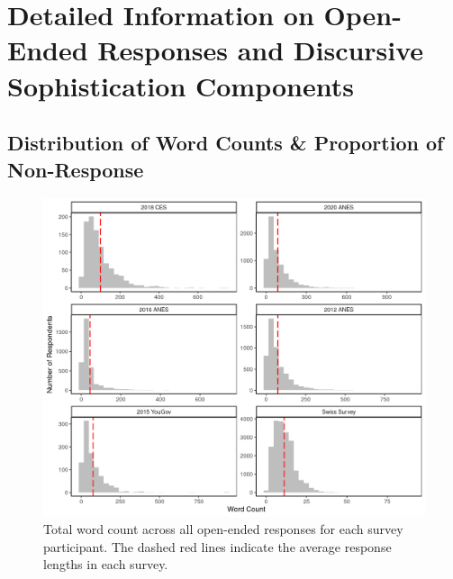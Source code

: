 


\clearpage
\section[Information on Discursive Sophistication Components]{Detailed Information on Open-Ended Responses and Discursive Sophistication Components}\label{app:oeinfo}

\subsection{Distribution of Word Counts \& Proportion of Non-Response}
\begin{figure}[ht]\centering
	\includegraphics{../fig/wc.png}
	\caption[Total word count across all open-ended responses]{Total word count across all open-ended responses for each survey participant. The dashed red lines indicate the average response lengths in each survey.}\label{fig:wc}
\end{figure}

